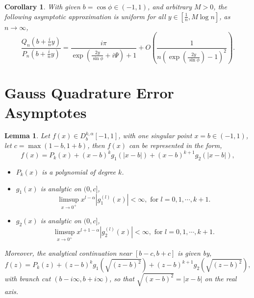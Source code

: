 \documentclass[11pt]{article}
\newtheorem{corollary}{Corollary}
\newtheorem{lemma}{Lemma}
\begin{document}
\begin{corollary} \label{Q_P_ratio_corollary}
With given $b = \cos \phi \in (-1,1)$, and arbitrary $M >0$, the following asymptotic approximation is uniform for all $\displaystyle y \in \left[\frac{1}{n}, M \log n\right]$, as $n \to \infty$,
\begin{equation}
    \frac{Q_n(b +\frac{i}{n}y)}{P_n(b +\frac{i}{n}y)} = \frac{i \pi}{\exp\left(\frac{2y}{\sin\phi}+i\Psi\right) + 1} + O\left(\frac{1}{n \left(\exp\left(\frac{2y}{\sin\phi}\right)-1\right)^2}\right). \label{Q_P_ratio}
\end{equation}
\end{corollary}

\section{Gauss Quadrature Error Asymptotes} \label{sec:proof}\begin{lemma} \label{f_decomposition}
    Let $f(x) \in D_b^{k,\alpha}[-1,1]$, with one singular point $x=b \in (-1,1)$, let $c = \max(1-b,1+b)$, then $f(x)$ can be represented in the form,
    \begin{equation}
        f(x) = P_{k}(x) + (x-b)^k g_1(|x-b|) + (x-b)^{k+1} g_2(|x-b|),
    \end{equation}
    \begin{itemize}
        \item $P_k(x)$ is a polynomial of degree $k$.
        \item $g_1(x)$ is analytic on $(0,c]$, \begin{equation}
            \limsup_{x\to 0^+} x^{l-\alpha} |g_1^{(l)}(x)| < \infty, \text{ for } l=0,1,\cdots,k+1. \label{g_1_condition}
        \end{equation}
        \item $g_2(x)$ is analytic on $(0,c]$, \begin{equation}
            \limsup_{x\to 0^+} x^{l+1-\alpha} |g_2^{(l)}(x)| < \infty, \text{ for } l=0,1,\cdots,k+1. \label{g_2_condition}
        \end{equation}
    \end{itemize}
    Moreover, the analytical continuation near $[b-c,b+c]$ is given by,
    \begin{equation}
        f(z) = P_{k}(z) + (z-b)^k g_1(\sqrt{(z-b)^2}) + (z-b)^{k+1} g_2(\sqrt{(z-b)^2}), \label{f_analytical_continuation}
    \end{equation}
    with branch cut $(b-i\infty,b+i\infty)$, so that $\sqrt{(x-b)^2}=|x-b|$ on the real axis.
\end{lemma}
\end{document}

